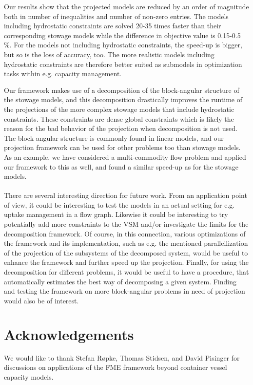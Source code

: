 Our results show that the projected models are reduced by an order of magnitude both in number of inequalities and number of non-zero entries. The models including hydrostatic constraints are solved 20-35 times faster than their corresponding stowage models while the difference in objective value is 0.15-0.5 \%. For the models not including hydrostatic constraints, the speed-up is bigger, but so is the loss of accuracy, too. The more realistic models including hydrostatic constraints are therefore better suited as submodels in optimization tasks within e.g. capacity management. 

Our framework makes use of a decomposition of the block-angular structure of the stowage models, and this decomposition drastically improves the runtime of the projections of the more complex stowage models that include hydrostatic constraints. These constraints are dense global constraints which is likely the reason for the bad behavior of the projection when decomposition is not used.
The block-angular structure is commonly found in linear models, and our projection framework can be used for other problems too than stowage models. As an example, we have considered a multi-commodity flow problem and applied our framework to this as well, and found a similar speed-up as for the stowage models. 
\\\\
{There are several interesting direction for future work. 
From an application point of view, it could be interesting to test the models in an actual setting for e.g. uptake management in a flow graph.
Likewise it could be interesting to try potentially add more constraints to the VSM and/or investigate the limits for the decomposition framework. Of course, in this connection, various optimizations of the framework and its implementation, such as e.g. the mentioned parallellization of the projection of the subsystems of the decomposed system, would be useful to enhance the framework and further speed up the projection.
Finally, for using the decomposition for different problems, it would be useful to have a procedure, that automatically estimates the best way of decomposing a given system. Finding and testing the framework on more block-angular problems in need of projection would also be of interest.} 

\section*{Acknowledgements}
We would like to thank Stefan R{\o}pke, Thomas Stidsen, and David Pisinger for discussions on applications of the FME framework beyond container vessel capacity models. 

{}



